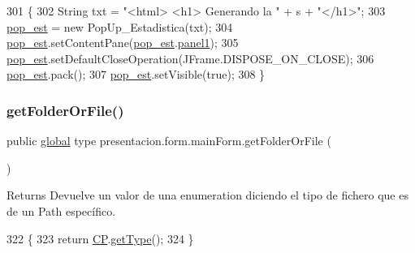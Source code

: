 \begin{DoxyCode}
301                                                  \{
302         String txt = \textcolor{stringliteral}{"<html> <h1> Generando la "} + s + \textcolor{stringliteral}{"</h1>"};
303         \hyperlink{classpresentacion_1_1form_1_1mainForm_ae04f75ed65fa9e0347f645e877f6eb95}{pop\_est} = \textcolor{keyword}{new} PopUp\_Estadistica(txt);
304         \hyperlink{classpresentacion_1_1form_1_1mainForm_ae04f75ed65fa9e0347f645e877f6eb95}{pop\_est}.setContentPane(\hyperlink{classpresentacion_1_1form_1_1mainForm_ae04f75ed65fa9e0347f645e877f6eb95}{pop\_est}.\hyperlink{classpresentacion_1_1form_1_1PopUp__Estadistica_ac276266d42b873f89883dd3a869feadf}{panel1});
305         \hyperlink{classpresentacion_1_1form_1_1mainForm_ae04f75ed65fa9e0347f645e877f6eb95}{pop\_est}.setDefaultCloseOperation(JFrame.DISPOSE\_ON\_CLOSE);
306         \hyperlink{classpresentacion_1_1form_1_1mainForm_ae04f75ed65fa9e0347f645e877f6eb95}{pop\_est}.pack();
307         \hyperlink{classpresentacion_1_1form_1_1mainForm_ae04f75ed65fa9e0347f645e877f6eb95}{pop\_est}.setVisible(\textcolor{keyword}{true});
308     \}
\end{DoxyCode}
\mbox{\label{classpresentacion_1_1form_1_1mainForm_af6d62b4914fbc44469a3c173e0472c43}} 
\subsubsection{\texorpdfstring{get\+Folder\+Or\+File()}{getFolderOrFile()}}
{\footnotesize\ttfamily public \hyperlink{classglobal_1_1global}{global} type presentacion.\+form.\+main\+Form.\+get\+Folder\+Or\+File (\begin{DoxyParamCaption}{ }\end{DoxyParamCaption})\hspace{0.3cm}{\ttfamily [inline]}}

\begin{DoxyReturn}{Returns}
Devuelve un valor de una enumeration diciendo el tipo de fichero que es de un Path específico. 
\end{DoxyReturn}

\begin{DoxyCode}
322                                          \{
323         \textcolor{keywordflow}{return} \hyperlink{classpresentacion_1_1form_1_1mainForm_a4d01396f002d4f9bd18db3877057c77b}{CP}.\hyperlink{classpresentacion_1_1Ctrl__Presentacio_1_1Ctrl__Presentacio_a029db5d77bf1e81be0811816a74d81a0}{getType}();
324     \}
\end{DoxyCode}
\mbox{\label{classpresentacion_1_1form_1_1mainForm_ac6348f8bdef39bfa651f145c00664320}} 
